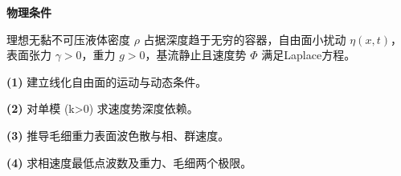 \textbf{物理条件}\par 理想无黏不可压液体密度 \(\rho\) 占据深度趋于无穷的容器，自由面小扰动 \(\eta(x,t)\)，表面张力 \(\gamma>0\)，重力 \(g>0\)，基流静止且速度势 \(\Phi\) 满足Laplace方程。
\par\noindent\textbf{(1)} 建立线化自由面的运动与动态条件。
\par\noindent\textbf{(2)} 对单模 (k>0) 求速度势深度依赖。
\par\noindent\textbf{(3)} 推导毛细重力表面波色散与相、群速度。
\par\noindent\textbf{(4)} 求相速度最低点波数及重力、毛细两个极限。
